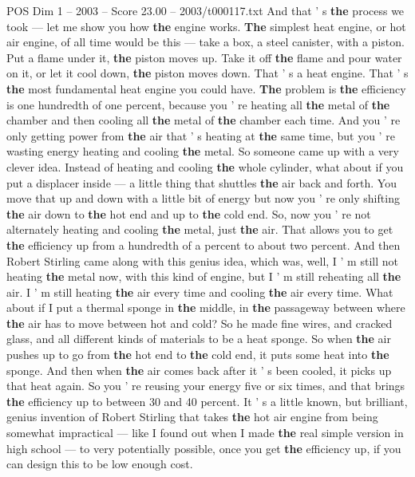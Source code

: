 \begin{textsample}{POS Dim 1 – 2003 – Score 23.00 – 2003/t000117.txt}
And that ' s \textbf{the} process we took — let me show you how \textbf{the} engine works. \textbf{The} simplest heat engine, or hot air engine, of all time would be this — take a box, a steel canister, with a piston.
Put a flame under it, \textbf{the} piston moves up.
Take it off \textbf{the} flame and pour water on it, or let it cool down, \textbf{the} piston moves down.
That ' s a heat engine.
That ' s \textbf{the} most fundamental heat engine you could have. \textbf{The} problem is \textbf{the} efficiency is one hundredth of one percent, because you ' re heating all \textbf{the} metal of \textbf{the} chamber and then cooling all \textbf{the} metal of \textbf{the} chamber each time.
And you ' re only getting power from \textbf{the} air that ' s heating at \textbf{the} same time, but you ' re wasting energy heating and cooling \textbf{the} metal.
So someone came up with a very clever idea.
Instead of heating and cooling \textbf{the} whole cylinder, what about if you put a displacer inside — a little thing that shuttles \textbf{the} air back and forth.
You move that up and down with a little bit of energy but now you ' re only shifting \textbf{the} air down to \textbf{the} hot end and up to \textbf{the} cold end.
So, now you ' re not alternately heating and cooling \textbf{the} metal, just \textbf{the} air.
That allows you to get \textbf{the} efficiency up from a hundredth of a percent to about two percent.
And then Robert Stirling came along with this genius idea, which was, well, I ' m still not heating \textbf{the} metal now, with this kind of engine, but I ' m still reheating all \textbf{the} air.
I ' m still heating \textbf{the} air every time and cooling \textbf{the} air every time.
What about if I put a thermal sponge in \textbf{the} middle, in \textbf{the} passageway between where \textbf{the} air has to move between hot and cold?
So he made fine wires, and cracked glass, and all different kinds of materials to be a heat sponge.
So when \textbf{the} air pushes up to go from \textbf{the} hot end to \textbf{the} cold end, it puts some heat into \textbf{the} sponge.
And then when \textbf{the} air comes back after it ' s been cooled, it picks up that heat again.
So you ' re reusing your energy five or six times, and that brings \textbf{the} efficiency up to between 30 and 40 percent.
It ' s a little known, but brilliant, genius invention of Robert Stirling that takes \textbf{the} hot air engine from being somewhat impractical — like I found out when I made \textbf{the} real simple version in high school — to very potentially possible, once you get \textbf{the} efficiency up, if you can design this to be low enough cost.

\end{textsample}

